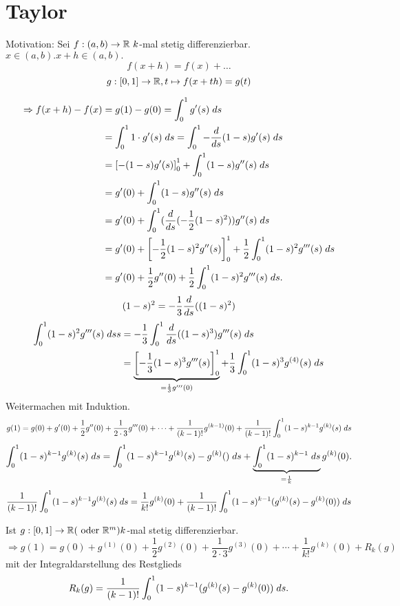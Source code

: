 \documentclass[../ana2.tex]{subfiles}
\begin{document}
\setcounter{section}{14}
\section{Taylor}

Motivation: Sei \( \abb{f}{(a,b)}{\R} \ k \)-mal stetig 
differenzierbar.
\( x \in (a,b). x + h \in (a,b). \)
\[ f(x + h) = f(x) + \dots \]
\[ \abb{g}{[0,1]}{\R}, t \mapsto f(x+th) = g(t) \]

\begin{align*}
    \Rightarrow f(x + h) - f(x) &= g(1) - g(0) 
    = \integralx{g'(s)}{0}{1}{s} \\
    &= \integralx{1 \cdot g'(s)}{0}{1}{s} = 
    \integralx{ -\ddx{s} (1-s) g'(s) }{0}{1}{s}\\
    &= \left[ -(1-s) g'(s) \right]_0^1 + \integralx{(1-s)g''(s)}{0}{1}{s}\\
    &= g'(0) + \integralx{ (1-s)g''(s) }{0}{1}{s} \\    
    &= g'(0) + \integralx{(\ddx{s}(-\frac{1}{2}(1-s)^2))g''(s)}{0}{1}{s}\\
    &= g'(0) + \left[- \frac{1}{2}(1-s)^2 g''(s) \right]_0^1 
    + \frac{1}{2}\integralx{ (1-s)^2 g'''(s)}{0}{1}{s} \\
    &= g'(0) + \frac{1}{2} g''(0) + \frac{1}{2} 
    \integralx{(1-s)^2 g'''(s)}{0}{1}{s}.
\end{align*}
\[ (1-s)^2 = -\frac{1}{3} \ddx{s}((1-s)^2) \]
\begin{align*}
    \integralx{(1-s)^2 g'''(s)}{0}{1}{s}{s} &=
    -\frac{1}{3} \integralx{\ddx{s} ((1-s)^3)g'''(s)}{0}{1}{s}\\
    &= \underbrace{\left[-\frac{1}{3}(1-s)^3g'''(s)\right]_0^1 }_{=\frac{1}{3}g'''(0)}
    + \frac{1}{3} \integralx{(1-s)^3 g^{(4)}(s)}{0}{1}{s}
\end{align*}
Weitermachen mit Induktion. 
\[ g(1) = g(0) + g'(0) + \frac{1}{2}g''(0) + \frac{1}{2 \cdot 3} g'''(0)
+ \cdots + \frac{1}{(k-1)!} g^{(k-1)}(0) 
+ \frac{1}{(k-1)!} \integralx{(1-s)^{k-1} g^{(k)}(s) }{0}{1}{s} \]
\[ \integralx{(1-s)^{k-1} g^{(k)}(s) }{0}{1}{s} 
= \integralx{(1-s)^{k-1} g^{(k)}(s) - g^{(k)}() }{0}{1}{s} 
+ \underbrace{\integralx{ (1-s)^{k-1} }{0}{1}{s}}_{=\frac{1}{k}} g^{(k)}(0). \]
\[ \frac{1}{(k-1)!} \integralx{(1-s)^{k-1} g^{(k)}(s) }{0}{1}{s} 
= \frac{1}{k!} g^{(k)}(0) + 
\frac{1}{(k-1)!} \integralx{(1-s)^{k-1} (g^{(k)}(s) - g^{(k)}(0))}{0}{1}{s} \]
\begin{lem}
    Ist \( \abb{g}{[0,1]}{\R} (\text{ oder } \R^m) k\)-mal stetig differenzierbar.    
    \[ \Rightarrow g(1) = 
    g(0) + g^{(1)}(0) + \frac{1}{2} g^{(2)}(0) 
    + \frac{1}{2 \cdot 3}g^{(3)}(0) + \cdots 
    + \frac{1}{k!} g^{(k)}(0) + R_k(g) \]
    mit der Integraldarstellung des Restglieds
    \[ R_k(g) = \frac{1}{(k-1)!} \integralx{(1-s)^{k-1} 
    (g^{(k)}(s) - g^{(k)}(0)) }{0}{1}{s}. \] 
\end{lem}
\end{document}
